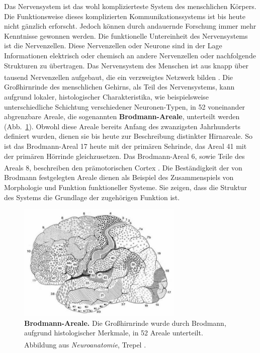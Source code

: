 \documentclass[12pt,a4paper,pdftex]{article}
\begin{document}
 Das Nervensystem ist das wohl komplizierteste System des menschlichen Körpers. Die Funktionsweise dieses komplizierten Kommunikationssystems ist bis heute nicht gänzlich erforscht. Jedoch können durch andauernde Forschung immer mehr Kenntnisse gewonnen werden. Die funktionelle Untereinheit des Nervensystems ist die Nervenzellen. Diese Nervenzellen oder Neurone sind in der Lage Informationen elektrisch oder chemisch an andere Nervenzellen oder nachfolgende Strukturen zu übertragen. Das Nervensystem des Menschen ist aus knapp über tausend Nervenzellen aufgebaut, die ein verzweigtes Netzwerk bilden \textsuperscript{\cite[1]{trepel2011neuroanatomie}}. Die Großhirnrinde des menschlichen Gehirns, als Teil des Nervensystems, kann aufgrund lokaler, histologischer Charakteristika, wie beispielsweise unterschiedliche Schichtung verschiedener Neuronen-Typen, in 52 voneinander abgrenzbare Areale, die sogenannten \textbf{Brodmann-Areale}, unterteilt werden (Abb.~\ref{fig:brodmann_areale}). Obwohl diese Areale bereits Anfang des zwanzigsten Jahrhunderts definiert wurden, dienen sie bis heute zur Beschreibung distinkter Hirnareale. So ist das Brodmann-Areal 17 heute mit der primären Sehrinde, das Areal 41 mit der primären Hörrinde gleichzusetzen. Das Brodmann-Areal 6, sowie Teile des Areals 8, beschreiben den prämotorischen Cortex \textsuperscript{\cite[9]{trepel2011neuroanatomie}}. Die Beständigkeit der von Brodmann festgelegten Areale dienen als Beispiel des Zusammenspiels von Morphologie und Funktion funktioneller Systeme. Sie zeigen, dass die Struktur des Systems die Grundlage der zugehörigen Funktion ist.

\begin{figure}[H]
    \centering
    \includegraphics[width=0.7\textwidth]{pictures/Bilder_Jule/Andere/brodmann.PNG}
    \caption[Brodmann-Areale]{\textbf{Brodmann-Areale.} Die Großhirnrinde wurde durch Brodmann, aufgrund histologischer Merkmale, in 52 Areale unterteilt. \\
    Abbildung aus \textit{Neuroanatomie}, Trepel \textsuperscript{\cite[9]{trepel2011neuroanatomie}}.}
    \label{fig:brodmann_areale}
\end{figure}
\end{document}
